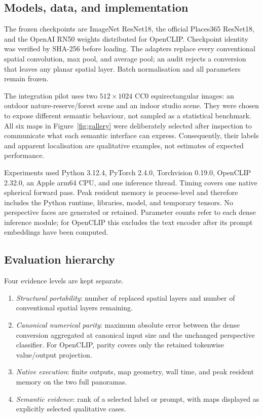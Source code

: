 \documentclass{isprs}
\begin{document}
\subsection{Models, data, and implementation}

The frozen checkpoints are ImageNet ResNet18, the official Places365 ResNet18,
and the OpenAI RN50 weights distributed for OpenCLIP.  Checkpoint identity was
verified by SHA-256 before loading.  The adapters replace every conventional
spatial convolution, max pool, and average pool; an audit rejects a conversion
that leaves any planar spatial layer.  Batch normalisation and all parameters
remain frozen.

The integration pilot uses two $512\!\times\!1024$ CC0 equirectangular images:
an outdoor nature-reserve/forest scene and an indoor studio scene.  They were
chosen to expose different semantic behaviour, not sampled as a statistical
benchmark.  All six maps in Figure~\ref{fig:gallery} were deliberately selected
after inspection to communicate what each semantic interface can express.
Consequently, their labels and apparent localisation are qualitative examples,
not estimates of expected performance.

Experiments used Python 3.12.4, PyTorch 2.4.0, Torchvision 0.19.0, OpenCLIP
2.32.0, an Apple arm64 CPU, and one inference thread.  Timing covers one native
spherical forward pass.  Peak resident memory is process-level and therefore
includes the Python runtime, libraries, model, and temporary tensors.  No
perspective faces are generated or retained.  Parameter counts refer to each
dense inference module; for OpenCLIP this excludes the text encoder after its
prompt embeddings have been computed.

\subsection{Evaluation hierarchy}

Four evidence levels are kept separate.

\begin{enumerate}
\setlength\itemsep{0pt}
\setlength\parskip{0pt}
\item \emph{Structural portability}: number of replaced spatial layers and
      number of conventional spatial layers remaining.
\item \emph{Canonical numerical parity}: maximum absolute error between the
      dense conversion aggregated at canonical input size and the unchanged
      perspective classifier.  For OpenCLIP, parity covers only the retained
      tokenwise value/output projection.
\item \emph{Native execution}: finite outputs, map geometry, wall time, and peak
      resident memory on the two full panoramas.
\item \emph{Semantic evidence}: rank of a selected label or prompt, with maps
      displayed as explicitly selected qualitative cases.
\end{enumerate}
\end{document}
